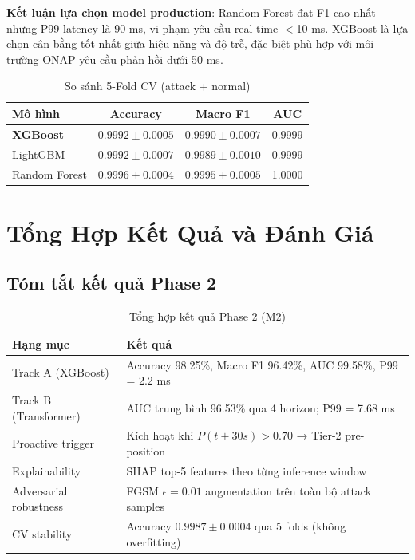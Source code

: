 \documentclass[12pt,a4paper]{article}
\begin{document}
\textbf{Kết luận lựa chọn model production}: Random Forest đạt F1 cao nhất nhưng P99 latency là 90 ms, vi phạm yêu cầu real-time $<$10 ms. XGBoost là lựa chọn cân bằng tốt nhất giữa hiệu năng và độ trễ, đặc biệt phù hợp với môi trường ONAP yêu cầu phản hồi dưới 50 ms.

\begin{table}[H]
\centering
\caption{So sánh 5-Fold CV (attack + normal)}
\label{tab:model_cv}
\begin{tabular}{lccc}
\toprule
\textbf{Mô hình} & \textbf{Accuracy} & \textbf{Macro F1} & \textbf{AUC} \\
\midrule
\textbf{XGBoost}  & $0.9992 \pm 0.0005$ & $0.9990 \pm 0.0007$ & 0.9999 \\
LightGBM          & $0.9992 \pm 0.0007$ & $0.9989 \pm 0.0010$ & 0.9999 \\
Random Forest     & $0.9996 \pm 0.0004$ & $0.9995 \pm 0.0005$ & 1.0000 \\
\bottomrule
\end{tabular}
\end{table}

\section{Tổng Hợp Kết Quả và Đánh Giá}

\subsection{Tóm tắt kết quả Phase 2}

\begin{table}[H]
\centering
\caption{Tổng hợp kết quả Phase 2 (M2)}
\label{tab:phase2_summary}
\begin{tabular}{p{3cm}p{10cm}}
\toprule
\textbf{Hạng mục} & \textbf{Kết quả} \\
\midrule
Track A (XGBoost)       & Accuracy 98.25\%, Macro F1 96.42\%, AUC 99.58\%, P99 = 2.2 ms \\
Track B (Transformer)   & AUC trung bình 96.53\% qua 4 horizon; P99 = 7.68 ms \\
Proactive trigger       & Kích hoạt khi $P(t+30s) > 0.70$ → Tier-2 pre-position \\
Explainability          & SHAP top-5 features theo từng inference window \\
Adversarial robustness  & FGSM $\epsilon=0.01$ augmentation trên toàn bộ attack samples \\
CV stability            & Accuracy $0.9987 \pm 0.0004$ qua 5 folds (không overfitting) \\
\bottomrule
\end{tabular}
\end{table}
\end{document}
